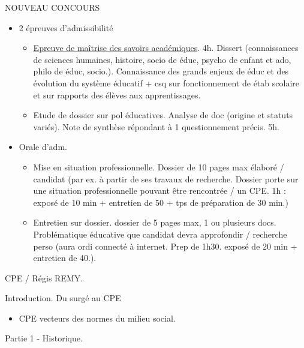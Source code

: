\documentclass[12pt]{article}
\begin{document}
NOUVEAU CONCOURS
\begin{itemize}
\item 2 épreuves d'admissibilité
\begin{itemize}
\item \underline{Epreuve de maîtrise des savoirs académiques}. 4h. Dissert (connaissances de sciences humaines, histoire, socio de éduc, psycho de enfant et ado, philo de éduc, socio.). Connaissance des grands enjeux de éduc et des évolution du système éducatif + csq sur fonctionnement de étab scolaire et sur rapports des élèves aux apprentissages.
\item Etude de dossier sur pol éducatives. Analyse de doc (origine et statuts variés). Note de synthèse répondant à 1 questionnement précis. 5h. \\
\end{itemize}

\item Orale d'adm.
\begin{itemize}
\item Mise en situation professionnelle. Dossier de 10 pages max élaboré / candidat (par ex. à partir de ses travaux de recherche. Dossier porte sur une situation professionnelle pouvant être rencontrée / un CPE. 1h : exposé de 10 min + entretien de 50 + tps de préparation de 30 min.) \\

\item Entretien sur dossier. dossier de 5 pages max, 1 ou plusieurs docs. Problématique éducative que candidat devra approfondir / recherche perso (aura ordi connecté à internet. Prep de 1h30. exposé de 20 min + entretien de 40.). \\
\end{itemize}
\end{itemize}

CPE / Régis REMY.

Introduction. Du surgé au CPE
\begin{itemize}
\item CPE vecteurs des normes du milieu social.
\end{itemize}

Partie 1 - Historique.
\end{document}

